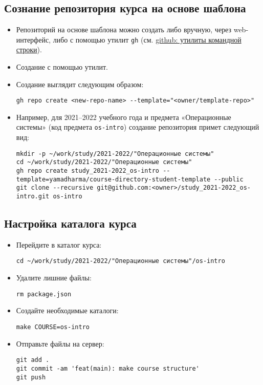 \subsection{Сознание репозитория курса на основе шаблона}
\label{sec:orgf3f8c19}

\begin{itemize}
\item Репозиторий на основе шаблона можно создать либо вручную, через web-интерфейс, либо с помощью утилит \texttt{gh} (см. \href{../notes/20210804144000-github_утилиты_команднои_строки.org}{github: утилиты командной строки}).
\item Создание с помощью утилит.
\item Создание выглядит следующим образом:
\begin{verbatim}
gh repo create <new-repo-name> --template="<owner/template-repo>"
\end{verbatim}
\item Например, для 2021--2022 учебного года и предмета «Операционные системы» (код предмета \texttt{os-intro}) создание репозитория примет следующий вид:
\begin{verbatim}
mkdir -p ~/work/study/2021-2022/"Операционные системы"
cd ~/work/study/2021-2022/"Операционные системы"
gh repo create study_2021-2022_os-intro --template=yamadharma/course-directory-student-template --public
git clone --recursive git@github.com:<owner>/study_2021-2022_os-intro.git os-intro
\end{verbatim}
\end{itemize}

\subsection{Настройка каталога курса}
\label{sec:org8b36581}

\begin{itemize}
\item Перейдите в каталог курса:
\begin{verbatim}
cd ~/work/study/2021-2022/"Операционные системы"/os-intro
\end{verbatim}

\item Удалите лишние файлы:
\begin{verbatim}
rm package.json
\end{verbatim}

\item Создайте необходимые каталоги:
\begin{verbatim}
make COURSE=os-intro
\end{verbatim}

\item Отправьте файлы на сервер:
\begin{verbatim}
git add .
git commit -am 'feat(main): make course structure'
git push
\end{verbatim}
\end{itemize}


\printbibliography[heading=subbibliography,resetnumbers=true]


